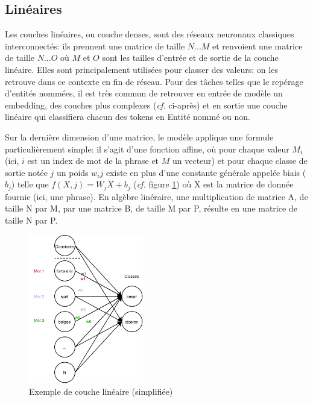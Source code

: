 \subsection{Linéaires}

Les couches linéaires, ou couche denses, sont des réseaux neuronaux classiques interconnectés: ils prennent une matrice de taille $N...M$ et renvoient une matrice de taille $N...O$ où $M$ et $O$ sont les tailles d'entrée et de sortie de la couche linéaire. Elles sont principalement utilisées pour classer des valeurs: on les retrouve dans ce contexte en fin de réseau. Pour des tâches telles que le repérage d'entités nommées, il est très commun de retrouver en entrée de modèle un embedding, des couches plus complexes (\textit{cf.} ci-après) et en sortie une couche linéaire qui classifiera chacun des tokens en Entité nommé ou non. 

Sur la dernière dimension d'une matrice, le modèle applique une formule particulièrement simple: il s'agit d'une fonction affine, où pour chaque valeur $M_{i}$ (ici, $i$ est un index de mot de la phrase et $M$ un vecteur) et pour chaque classe de sortie notée $j$  un poids $w_{i}{j}$ existe en plus d'une constante générale appelée biais ($b_{j}$) telle que $f(X, j) = W_{j} \dot X + b_{j}$ (\textit{cf.} figure \ref{deep-learning:simple-linear}) où X est la matrice de donnée fournie (ici, une phrase). En algèbre linéraire, une multiplication de matrice A, de taille N par M, par une matrice B, de taille M par P, résulte en une matrice de taille N par P.  

\begin{figure}
    \centering
    \includegraphics[width=5cm]{results/deep-learning/explanations/SimpleLinear.png}
    \caption{Exemple de couche linéaire (simplifiée)}
    \label{deep-learning:simple-linear}
\end{figure}

